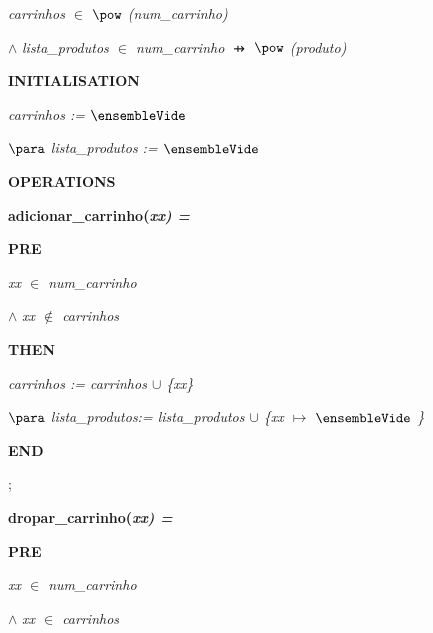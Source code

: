 \documentclass[11pt]{article}
\begin{document}
\begin{sloppypar}
\hspace*{0.20in}\it carrinhos $\in$   $\pow$ \rm (\it num\_carrinho\rm )

\hspace*{0.20in} $\land$  \it lista\_produtos $\in$  \it num\_carrinho  $\pfun$   $\pow$ \rm (\it produto\rm )

\hspace*{0.20in}

\bf INITIALISATION

\hspace*{0.20in}\it carrinhos \rm :=  $\ensembleVide$ 

\hspace*{0.20in} $\para$  \it lista\_produtos \rm :=  $\ensembleVide$ 

\bf OPERATIONS

\hspace*{0.20in}\bf adicionar\_carrinho\rm (\it xx\rm ) \rm = 

\hspace*{0.20in}\bf PRE

\hspace*{0.40in}\it xx  $\in$  \it num\_carrinho

\hspace*{0.40in} $\land$  \it xx  $\not\in$  \it carrinhos

\hspace*{0.20in}\bf THEN

\hspace*{0.40in}\it carrinhos \rm := \it carrinhos  $\cup$  \rm \{\it xx\rm \}

\hspace*{0.40in} $\para$  \it lista\_produtos\rm := \it lista\_produtos  $\cup$  \rm \{\it xx  $\mapsto$   $\ensembleVide$ \rm \}

\hspace*{0.60in}

\hspace*{0.20in}\bf END

\hspace*{0.20in}\rm ;

\hspace*{0.20in}\bf dropar\_carrinho\rm (\it xx\rm ) \rm =

\hspace*{0.20in}\bf PRE

\hspace*{0.40in}\it xx  $\in$  \it num\_carrinho

\hspace*{0.40in} $\land$  \it xx  $\in$  \it carrinhos


\end{sloppypar}
\end{document}
